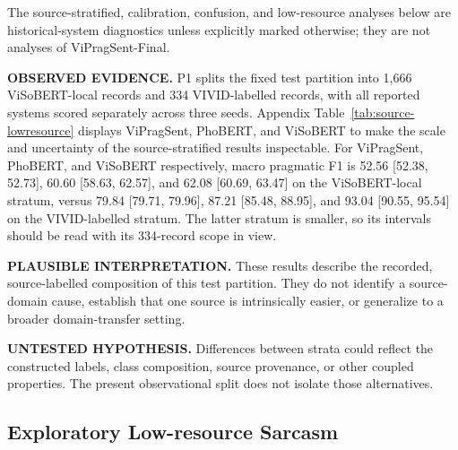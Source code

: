 The source-stratified, calibration, confusion, and low-resource analyses below are historical-system diagnostics unless explicitly marked otherwise; they are not analyses of ViPragSent-Final.

\textbf{OBSERVED EVIDENCE.} P1 splits the fixed test partition into 1,666 ViSoBERT-local records and 334 VIVID-labelled records, with all reported systems scored separately across three seeds. Appendix Table~\ref{tab:source-lowresource} displays ViPragSent, PhoBERT, and ViSoBERT to make the scale and uncertainty of the source-stratified results inspectable.
For ViPragSent, PhoBERT, and ViSoBERT respectively, macro pragmatic F1 is 52.56 [52.38, 52.73], 60.60 [58.63, 62.57], and 62.08 [60.69, 63.47] on the ViSoBERT-local stratum, versus 79.84 [79.71, 79.96], 87.21 [85.48, 88.95], and 93.04 [90.55, 95.54] on the VIVID-labelled stratum. The latter stratum is smaller, so its intervals should be read with its 334-record scope in view.

\textbf{PLAUSIBLE INTERPRETATION.} These results describe the recorded, source-labelled composition of this test partition. They do not identify a source-domain cause, establish that one source is intrinsically easier, or generalize to a broader domain-transfer setting.

\textbf{UNTESTED HYPOTHESIS.} Differences between strata could reflect the constructed labels, class composition, source provenance, or other coupled properties. The present observational split does not isolate those alternatives.

\subsection{Exploratory Low-resource Sarcasm}

